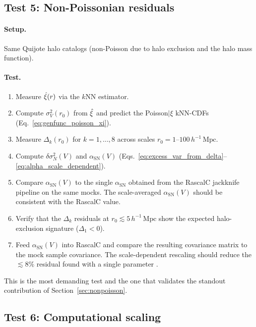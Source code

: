 \subsection{Test 5: Non-Poissonian residuals}
\label{sec:test_nonpoisson}

\paragraph{Setup.}  Same Quijote halo catalogs (non-Poisson due to halo exclusion and the halo mass function).

\paragraph{Test.}
\begin{enumerate}[nosep]
  \item Measure $\hat{\xi}(r)$ via the $k$NN estimator.
  \item Compute $\sigma_V^2(r_0)$ from $\hat{\xi}$ and predict the Poisson$|\xi$ kNN-CDFs (Eq.~\ref{eq:genfunc_poisson_xi}).
  \item Measure $\Delta_k(r_0)$ for $k = 1, \ldots, 8$ across scales $r_0 = 1$--$100\,h^{-1}\,\mathrm{Mpc}$.
  \item Compute $\delta\sigma^2_N(V)$ and $\alpha_{\mathrm{SN}}(V)$ (Eqs.~\ref{eq:excess_var_from_delta}--\ref{eq:alpha_scale_dependent}).
  \item Compare $\alpha_{\mathrm{SN}}(V)$ to the single $\alpha_{\mathrm{SN}}$ obtained from the RascalC jackknife pipeline on the same mocks.  The scale-averaged $\alpha_{\mathrm{SN}}(V)$ should be consistent with the RascalC value.
  \item Verify that the $\Delta_k$ residuals at $r_0 \lesssim 5\,h^{-1}\,\mathrm{Mpc}$ show the expected halo-exclusion signature ($\Delta_1 < 0$).
  \item Feed $\alpha_{\mathrm{SN}}(V)$ into RascalC and compare the resulting covariance matrix to the mock sample covariance.  The scale-dependent rescaling should reduce the $\lesssim 8\%$ residual found with a single parameter \citep{Rashkovetskyi2024}.
\end{enumerate}
This is the most demanding test and the one that validates the standout contribution of Section~\ref{sec:nonpoisson}.

\subsection{Test 6: Computational scaling}
\label{sec:test_scaling}

